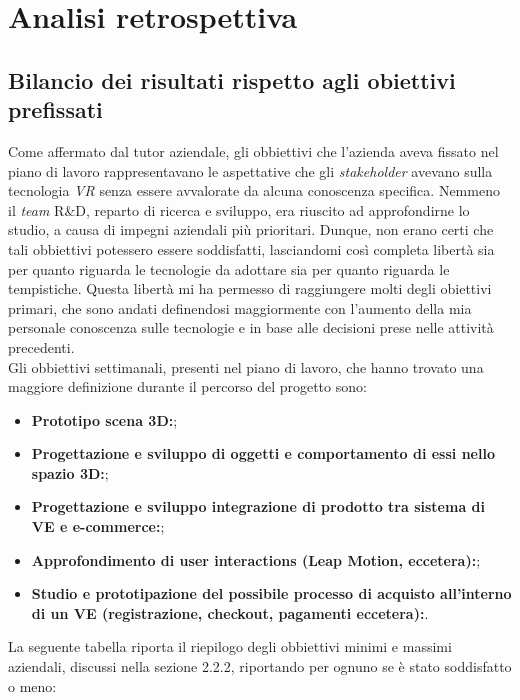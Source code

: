 \newpage
\chapter{Analisi retrospettiva}
\label{cap:analisiretrospettiva}

\section{Bilancio dei risultati rispetto agli obiettivi prefissati}

Come affermato dal tutor aziendale, gli obbiettivi che l'azienda aveva fissato nel piano di lavoro rappresentavano le aspettative che gli \textit{stakeholder}\hyperlink{sh}{} avevano sulla tecnologia \textit{VR} senza essere avvalorate da alcuna conoscenza specifica. Nemmeno il \textit{team} R\&D, reparto di ricerca e sviluppo, era riuscito ad approfondirne lo studio, a causa di impegni aziendali più prioritari. Dunque, non erano certi che tali obbiettivi potessero essere soddisfatti, lasciandomi così completa libertà sia per quanto riguarda le tecnologie da adottare sia per quanto riguarda le tempistiche. Questa libertà mi ha permesso di raggiungere molti degli obiettivi primari, che sono andati definendosi maggiormente con l'aumento della mia personale conoscenza sulle tecnologie e in base alle decisioni prese nelle attività precedenti. \\
Gli obbiettivi settimanali, presenti nel piano di lavoro, che hanno trovato una maggiore definizione durante il percorso del progetto sono:

\begin{itemize}
	\item \textbf{Prototipo scena 3D:};
	\item \textbf{Progettazione e sviluppo di oggetti e comportamento di essi nello spazio 3D:};
	\item \textbf{Progettazione e sviluppo integrazione di prodotto tra sistema di VE e e-commerce:};
	\item \textbf{Approfondimento di user interactions (Leap Motion, eccetera):};
	\item \textbf{Studio e prototipazione del possibile processo di acquisto all’interno di un VE (registrazione, checkout, pagamenti eccetera):}.
\end{itemize} 

La seguente tabella riporta il riepilogo degli obbiettivi minimi e massimi aziendali, discussi nella sezione 2.2.2, riportando per ognuno se è stato soddisfatto o meno:

